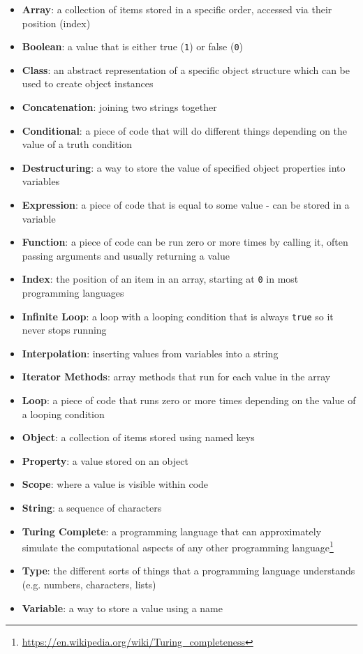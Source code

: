\begin{itemize}[leftmargin=*]
    \item
        \textbf{Array}:
        a collection of items stored in a specific order, accessed via their position (index)
    \item
        \textbf{Boolean}:
        a value that is either true (\texttt{1}) or false (\texttt{0})
    \item
        \textbf{Class}:
        an abstract representation of a specific object structure which can be used to create object instances
    \item
        \textbf{Concatenation}:
        joining two strings together
    \item
        \textbf{Conditional}:
        a piece of code that will do different things depending on the value of a truth condition
    \item
        \textbf{Destructuring}:
        a way to store the value of specified object properties into variables
    \item
        \textbf{Expression}:
        a piece of code that is equal to some value - can be stored in a variable
    \item
        \textbf{Function}:
        a piece of code can be run zero or more times by calling it, often passing arguments and usually returning a value
    \item
        \textbf{Index}:
        the position of an item in an array, starting at \texttt{0} in most programming languages
    \item
        \textbf{Infinite Loop}:
        a loop with a looping condition that is always \texttt{true} so it never stops running
    \item
        \textbf{Interpolation}:
        inserting values from variables into a string
    \item
        \textbf{Iterator Methods}:
        array methods that run for each value in the array
    \item
        \textbf{Loop}:
        a piece of code that runs zero or more times depending on the value of a looping condition
    \item
        \textbf{Object}:
        a collection of items stored using named keys
    \item
        \textbf{Property}:
        a value stored on an object
    \item
        \textbf{Scope}:
        where a value is visible within code
    \item
        \textbf{String}:
        a sequence of characters
    \item
        \textbf{Turing Complete}:
        a programming language that can approximately simulate the computational aspects of any other programming language\footnote{\href{https://en.wikipedia.org/wiki/Turing\_completeness}{https://en.wikipedia.org/wiki/Turing\_completeness}}
    \item
        \textbf{Type}:
        the different sorts of things that a programming language understands (e.g. numbers, characters, lists)
    \item
        \textbf{Variable}: a
        way to store a value using a name
\end{itemize}
